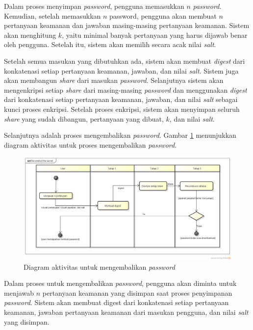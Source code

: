 Dalam proses menyimpan \textit{password}, pengguna memasukkan $n$ \textit{password}. Kemudian, setelah memasukkan $n$ password, pengguna akan membuat $n$ pertanyaan keamanan dan jawaban masing-masing pertanyaan keamanan. Sistem akan menghitung $k$, yaitu minimal banyak pertanyaan yang harus dijawab benar oleh pengguna. Setelah itu, sistem akan memilih secara acak nilai \textit{salt}.

Setelah semua masukan yang dibutuhkan ada, sistem akan membuat \textit{digest} dari konkatenasi setiap pertanyaan keamanan, jawaban, dan nilai \textit{salt}. Sistem juga akan membangun \textit{share} dari masukan \textit{password}. Selanjutnya sistem akan mengenkripsi setiap \textit{share} dari masing-masing \textit{password} dan menggunakan \textit{digest} dari konkatenasi setiap pertanyaan keamanan, jawaban, dan nilai \textit{salt} sebagai kunci proses enkripsi. Setelah proses enkripsi, sistem akan menyimpan seluruh \textit{share} yang sudah dibangun, pertanyaan yang dibuat, $k$, dan nilai \textit{salt}.

Selanjutnya adalah proses mengembalikan \textit{password}. Gambar \ref{fig:activity2} menunjukkan diagram aktivitas untuk proses mengembalikan \textit{password}.

\begin{figure}[H]
	\centerline{\includegraphics[scale=0.4]{Gambar/reconstruct-secret}}
	\caption{Diagram aktivitas untuk mengembalikan \textit{password}}\label{fig:activity2}
\end{figure}

Dalam proses untuk mengembalikan \textit{password}, pengguna akan diminta untuk menjawab $n$ pertanyaan keamanan yang disimpan saat proses penyimpanan \textit{password}. Sistem akan membuat digest dari konkatenasi setiap pertanyaan keamanan, jawaban pertanyaan keamanan dari masukan pengguna, dan nilai \textit{salt} yang disimpan.

